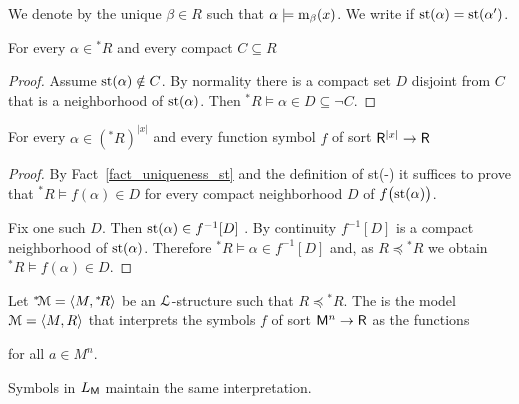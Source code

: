 \documentclass[10pt,oneside]{amsproc}
\renewcommand*{\emph}[1]{%
   \smash{\tikz[baseline]\node[rectangle, fill=teal!25, rounded corners, inner xsep=0.5ex, inner ysep=0.2ex, anchor=base, minimum height = 2.7ex]{#1};}}
\begin{document}
We denote by \emph{${\rm st}(\alpha)$\/} the unique $\beta\in R$ such that $\alpha\models{\rm m}_\beta(x)$.
We write \emph{$\alpha\approx\alpha'$\/} if ${\rm st}(\alpha)={\rm st}(\alpha')$.

\begin{fact}\label{fact_st1}
  For every $\alpha\in{}^*\! R$ and every compact $C\subseteq R$

\end{fact}

\begin{proof}
  Assume ${\rm st}(\alpha)\notin C$.
  By normality there is a compact set $D$ disjoint from $C$ that is a neighborhood of ${\rm st}(\alpha)$.
  Then  ${}^*\!R\models\alpha\in D\subseteq\neg C$.
\end{proof}

\begin{fact}\label{fact_terms_st}
  For every $\alpha\in({}^*\! R)^{|x|}$ and every function symbol $f$ of sort ${\sf R}^{|x|}\to{\sf R}$

\end{fact}

\begin{proof}
  By Fact~\ref{fact_uniqueness_st} and the definition of st(-) it suffices to prove that ${}^*\!R\models f(\alpha)\in D$ for every compact neighborhood $D$ of $f\big({\rm st}(\alpha)\big)$.
  
  Fix one such $D$.
  Then ${\rm st}(\alpha)\in f^{-1}[D]$ .
  By continuity $f^{-1}[D]$ is a compact neighborhood of ${\rm st}(\alpha)$.
  Therefore ${}^*\!R\models \alpha\in f^{-1}[D]$ and, as $R\preceq{}^*\!R$ we obtain ${}^*\!R\models f(\alpha)\in D$.
\end{proof}

Let ${}^*{\!\EuScript M}=\langle M,{}^*\!R\rangle$ be an ${\EuScript L}$-structure such that $R\preceq{}^*\!R$.
The \emph{standard part of ${}^*{\!\EuScript M}$\/} is the model ${\EuScript M}=\langle M,R\rangle$ that interprets the symbols $f$ of sort ${\sf M}^n\to {\sf R}$ as the functions

\hfill for all $a\in M^n$.

Symbols in $L_{\sf M}$ maintain the same interpretation.
\end{document}
